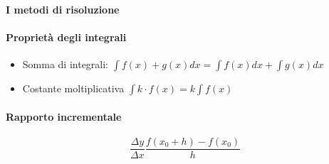 \documentclass[12pt, a4paper, openany]{book}
\begin{document}
\paragraph*{I metodi di risoluzione}
\paragraph*{Proprietà degli integrali}
\begin{itemize}
	\item Somma di integrali: $\int f(x)+g(x) dx = \int f(x) dx + \int g(x) dx$
	\item Costante moltiplicativa $\int k \cdot f(x) = k \int f(x)$
\end{itemize}

\paragraph*{Rapporto incrementale}
$$\frac{\Delta y}{ \Delta x}\frac{f(x_0+h)-f(x_0)}{h} $$
\end{document}
